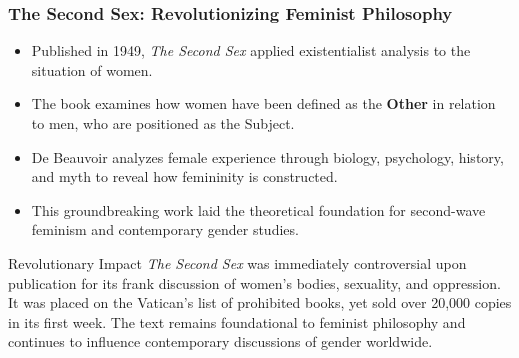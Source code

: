 \documentclass[aspectratio=169]{beamer}
\begin{document}
		\begin{frame}
			\frametitle{The Second Sex: Revolutionizing Feminist Philosophy}
			\begin{itemize}
				\item Published in 1949, \textit{The Second Sex} applied existentialist analysis to the situation of women.
				\item The book examines how women have been defined as the \textbf{Other} in relation to men, who are positioned as the Subject.
				\item De Beauvoir analyzes female experience through biology, psychology, history, and myth to reveal how femininity is constructed.
				\item This groundbreaking work laid the theoretical foundation for second-wave feminism and contemporary gender studies.
			\end{itemize}
			
			\begin{alertblock}{Revolutionary Impact}
				\textit{The Second Sex} was immediately controversial upon publication for its frank discussion of women's bodies, sexuality, and oppression. It was placed on the Vatican's list of prohibited books, yet sold over 20,000 copies in its first week. The text remains foundational to feminist philosophy and continues to influence contemporary discussions of gender worldwide.
			\end{alertblock}
		\end{frame}
		
\end{document}
